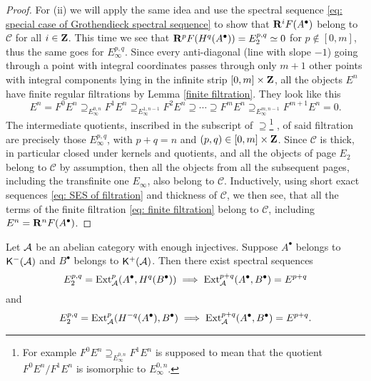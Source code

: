 \begin{proof}
    For (ii) we will apply the same idea and use the spectral sequence \eqref{eq: special case of Grothendieck spectral sequence} to show that $\mathbf{R}^{i}F(A^\bullet)$ belong to $\mathcal C$ for all $i \in \mathbf Z$. This time we see that $\mathbf{R}^{p}F(H^q(A^\bullet)) = E^{p,q}_2 \simeq 0$ for $p \notin [0,m]$, thus the same goes for $E^{p,q}_\infty$. Since every anti-diagonal (line with slope $-1$) going through a point with integral coordinates passes through only $m+1$ other points with integral components lying in the infinite strip $[0,m] \times \mathbf Z$, all the objects $E^n$ have finite regular filtrations by Lemma \ref{finite filtration}. They look like this
    \begin{equation}
        \label{eq: finite filtration}
        E^n = F^0E^n \supseteq_{E^{0,n}_\infty} F^1E^n \supseteq_{E^{1, n-1}_\infty} F^2E^n \supseteq \cdots \supseteq F^mE^n \supseteq_{E^{m, n-1}_\infty} F^{m+1}E^n = 0.
    \end{equation}
    The intermediate quotients, inscribed in the subscript of $\supseteq$\footnote{
        For example $F^0E^n \supseteq_{E^{0,n}_\infty} F^1E^n$ is supposed to mean that the quotient $F^0E^n / F^1E^n$ is isomorphic to $E^{0,n}_\infty$.}
    , of said filtration are precisely those $E^{p,q}_\infty$, with $p+q = n$ and $(p,q) \in [0,m] \times \mathbf Z$. Since $\mathcal C$ is thick, in particular closed under kernels and quotients, and all the objects of page $E_2$ belong to $\mathcal C$ by assumption, then all the objects from all the subsequent pages, including the transfinite one $E_\infty$, also belong to $\mathcal C$. 
    Inductively, using short exact sequences \eqref{eq: SES of filtration} and thickness of $\mathcal C$, we then see, that all the terms of the finite filtration \eqref{eq: finite filtration} belong to $\mathcal C$, including $E^n = \mathbf{R}^{n}F(A^\bullet)$.
\end{proof}

\begin{proposition}
    Let $\mathcal A$ be an abelian category with enough injectives. Suppose $A^\bullet$ belongs to $\mathsf{K}^-(\mathcal A)$ and $B^\bullet$ belongs to $\mathsf{K}^+(\mathcal A)$. Then there exist spectral sequences 
        \begin{equation}
        \label{eq: Spectral sequence Ext 2}
        E^{p,q}_2 = \operatorname{Ext}^p_\mathcal A(A^\bullet, H^q(B^\bullet)) \implies \operatorname{Ext}^{p+q}_\mathcal A(A^\bullet, B^\bullet) = E^{p+q}
    \end{equation}
    and
    \begin{equation}
        \label{eq: Spectral sequence Ext 1}
        E^{p,q}_2 = \operatorname{Ext}^p_\mathcal A(H^{-q}(A^\bullet), B^\bullet) \implies \operatorname{Ext}^{p+q}_\mathcal A(A^\bullet, B^\bullet) = E^{p+q}.
    \end{equation}
\end{proposition}

